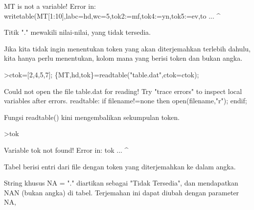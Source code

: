 \documentclass[a4paper,10pt]{article}
\begin{document}
\begin{eulernotebook}
\begin{eulercomment}
\begin{eulercomment}
\begin{eulercomment}
\begin{eulercomment}
\begin{eulercomment}
\begin{eulercomment}
\begin{eulercomment}
\begin{eulercomment}
\begin{eulercomment}
\begin{eulercomment}
\begin{eulercomment}
\begin{eulercomment}
\begin{eulercomment}
\begin{eulercomment}
\begin{eulercomment}
\begin{eulercomment}
\begin{eulercomment}
\begin{eulercomment}
\begin{eulercomment}
\begin{eulercomment}
\begin{eulercomment}
\begin{eulercomment}
\begin{eulercomment}
\begin{eulercomment}
\begin{eulercomment}
\begin{eulercomment}
\begin{eulercomment}
\begin{eulercomment}
\begin{eulercomment}
\begin{eulercomment}
\begin{eulercomment}
\begin{eulercomment}
\begin{eulercomment}
\begin{eulercomment}
\begin{eulercomment}
\begin{eulercomment}
\begin{eulercomment}
\begin{eulercomment}
\begin{eulercomment}
\begin{eulercomment}
\begin{eulercomment}
\begin{eulercomment}
\begin{eulercomment}
\begin{eulercomment}
\begin{eulercomment}
\begin{eulercomment}
\begin{eulercomment}
\begin{eulercomment}
\begin{eulercomment}
\begin{eulercomment}
\begin{eulercomment}
\begin{eulercomment}
\begin{eulercomment}
\begin{eulercomment}
\begin{eulercomment}
\begin{eulercomment}
\begin{eulercomment}
\begin{eulercomment}
\begin{eulercomment}
\begin{eulercomment}
\begin{eulercomment}
\begin{eulercomment}
\begin{eulercomment}
\begin{eulercomment}
\begin{eulercomment}
\begin{eulercomment}
\begin{euleroutput}
MT is not a variable!
  Error in:
  writetable(MT[1:10],labc=hd,wc=5,tok2:=mf,tok4:=yn,tok5:=ev,to ...
                     ^
\end{euleroutput}
\begin{eulercomment}
Titik "." mewakili nilai-nilai, yang tidak tersedia.

Jika kita tidak ingin menentukan token yang akan diterjemahkan
terlebih dahulu, kita hanya perlu menentukan, kolom mana yang berisi
token dan bukan angka.
\end{eulercomment}
\begin{eulerprompt}
>ctok=[2,4,5,7]; \{MT,hd,tok\}=readtable("table.dat",ctok=ctok);
\end{eulerprompt}
\begin{euleroutput}
  Could not open the file
  table.dat
  for reading!
  Try "trace errors" to inspect local variables after errors.
  readtable:
      if filename!=none then open(filename,"r"); endif;
\end{euleroutput}
\begin{eulercomment}
Fungsi readtable() kini mengembalikan sekumpulan token.
\end{eulercomment}
\begin{eulerprompt}
>tok
\end{eulerprompt}
\begin{euleroutput}
  Variable tok not found!
  Error in:
  tok ...
     ^
\end{euleroutput}
\begin{eulercomment}
Tabel berisi entri dari file dengan token yang diterjemahkan ke dalam
angka.

String khusus NA = "." diartikan sebagai "Tidak Tersedia", dan
mendapatkan NAN (bukan angka) di tabel. Terjemahan ini dapat diubah
dengan parameter NA, 
\end{eulercomment}
\end{eulercomment}
\end{eulercomment}
\end{eulercomment}
\end{eulercomment}
\end{eulercomment}
\end{eulercomment}
\end{eulercomment}
\end{eulercomment}
\end{eulercomment}
\end{eulercomment}
\end{eulercomment}
\end{eulercomment}
\end{eulercomment}
\end{eulercomment}
\end{eulercomment}
\end{eulercomment}
\end{eulercomment}
\end{eulercomment}
\end{eulercomment}
\end{eulercomment}
\end{eulercomment}
\end{eulercomment}
\end{eulercomment}
\end{eulercomment}
\end{eulercomment}
\end{eulercomment}
\end{eulercomment}
\end{eulercomment}
\end{eulercomment}
\end{eulercomment}
\end{eulercomment}
\end{eulercomment}
\end{eulercomment}
\end{eulercomment}
\end{eulercomment}
\end{eulercomment}
\end{eulercomment}
\end{eulercomment}
\end{eulercomment}
\end{eulercomment}
\end{eulercomment}
\end{eulercomment}
\end{eulercomment}
\end{eulercomment}
\end{eulercomment}
\end{eulercomment}
\end{eulercomment}
\end{eulercomment}
\end{eulercomment}
\end{eulercomment}
\end{eulercomment}
\end{eulercomment}
\end{eulercomment}
\end{eulercomment}
\end{eulercomment}
\end{eulercomment}
\end{eulercomment}
\end{eulercomment}
\end{eulercomment}
\end{eulercomment}
\end{eulercomment}
\end{eulercomment}
\end{eulercomment}
\end{eulercomment}
\end{eulercomment}
\end{eulercomment}
\end{eulernotebook}
\end{document}
